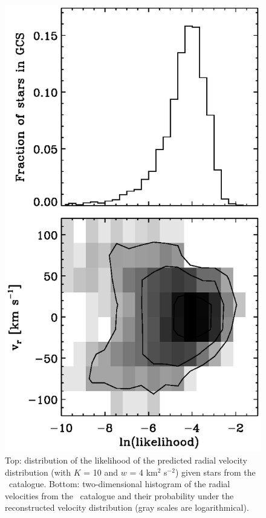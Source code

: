 \clearpage
\begin{figure}
\includegraphics{hist_gcs_like.ps}
\caption{Top: distribution of the likelihood of the predicted radial velocity distribution (with $K$ = 10 and $w$ = 4 km$^2$ s$^{-2}$) given stars from the \gcsabb\ catalogue. Bottom: two-dimensional histogram of the radial velocities from the \gcsabb\ catalogue and their probability under the reconstructed velocity distribution (gray scales are logarithmical).}%
\label{fig:hist_gcs_like}
\end{figure}

